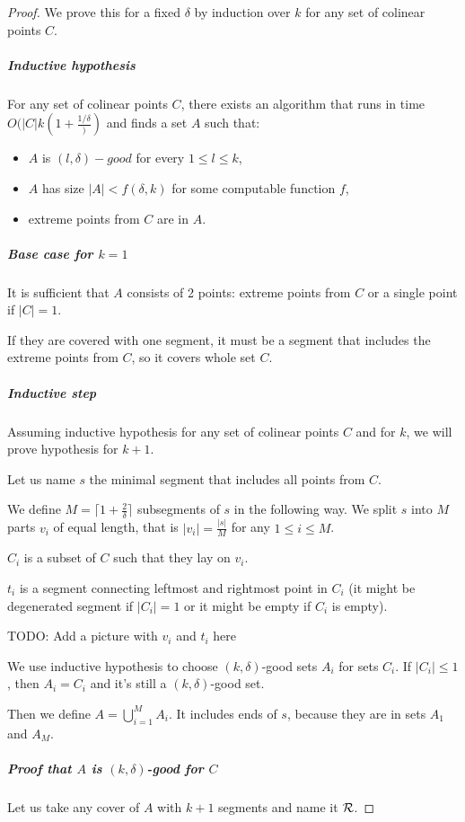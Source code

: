 \begin{proof}
We prove this for a fixed $\delta$
by induction over $k$ for any set of colinear points $C$.

\subparagraph{Inductive hypothesis}
For any set of colinear points $C$,
there exists an algorithm that 
runs in time $O(|C|k(1+\frac{1/\delta}))$
and finds a set $A$ such that:
\begin{itemize}
\item $A$ is $(l, \delta)-good$ for every $1 \le l \le k$,
\item $A$ has size $|A| < f(\delta, k)$ for some computable function $f$,
\item extreme points from $C$ are in $A$.
\end{itemize}

\subparagraph{Base case for $k = 1$}
It is sufficient that $A$ consists of 2 points: extreme points from $C$
or a single point if $|C| = 1$.

If they are covered with one segment, it must be a segment 
that includes the extreme points from $C$, so it covers whole set $C$.

\subparagraph{Inductive step}
Assuming inductive hypothesis for any set of colinear points $C$
and for $k$, we will prove hypothesis for $k+1$.

Let us name $s$ the minimal segment that includes all points from $C$.

We define $M = \lceil1+\frac{2}{\delta}\rceil$ subsegments of $s$ in the following way.
We split $s$ into $M$ parts 
$v_i$ of equal length, that is $|v_i| = \frac{|s|}{M}$ for any $1 \le i \le M$.

$C_i$ is a subset of $C$ such that they lay on $v_i$.

$t_i$ is a segment connecting leftmost and rightmost point in $C_i$
(it might be degenerated segment if $|C_i| = 1$ or it might be empty
if $C_i$ is empty).

TODO: Add a picture with $v_i$ and $t_i$ here

We use inductive hypothesis to choose $(k, \delta)$-good sets $A_i$
for sets $C_i$. If $|C_i| \le 1$, then $A_i = C_i$
and it's still a $(k, \delta)$-good set.

Then we define $A = \bigcup_{i=1}^{M} A_i$.
It includes ends of $s$, because they are in sets $A_1$ and $A_M$.

\subparagraph{Proof that $A$ is $(k, \delta)$-good for $C$}
Let us take any cover of $A$ with $k+1$ segments and name it $\mathcal{R}$.


\end{proof}
